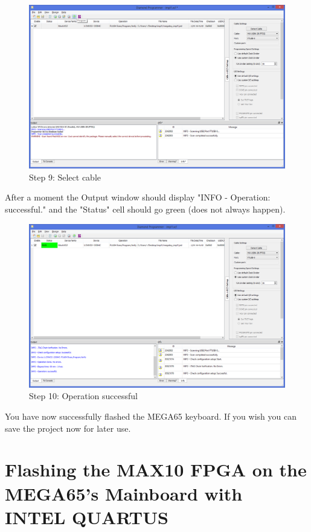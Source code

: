 \begin{figure}
  \includegraphics[width=\linewidth]{images/diamond09.png}
  \caption{Step 9: Select cable}
  \label{fig:diamond09}
\end{figure}

After a moment  the Output window should display "INFO - Operation: successful." and the "Status" cell should go green (does not always happen).

\begin{figure}
  \includegraphics[width=\linewidth]{images/diamond10.png}
  \caption{Step 10: Operation successful}
  \label{fig:diamond10}
\end{figure}

You have now successfully flashed the MEGA65 keyboard. If you wish you can save the project now for later use.

\section{Flashing the MAX10 FPGA on the MEGA65's Mainboard with INTEL QUARTUS}

